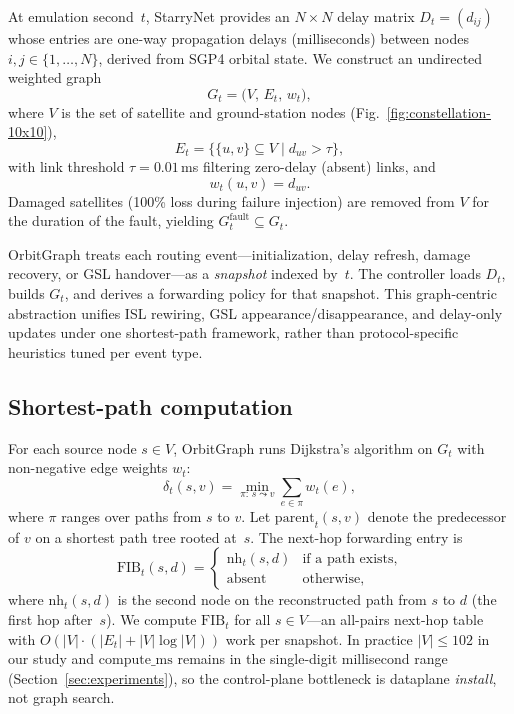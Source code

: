 At emulation second~$t$, StarryNet provides an $N \times N$ delay matrix
$D_t = (d_{ij})$ whose entries are one-way propagation delays (milliseconds)
between nodes $i,j \in \{1,\ldots,N\}$, derived from SGP4 orbital state.
We construct an undirected weighted graph
\begin{equation}
  G_t = \bigl(V,\, E_t,\, w_t\bigr),
  \label{eq:graph}
\end{equation}
where $V$ is the set of satellite and ground-station nodes (Fig.~\ref{fig:constellation-10x10}),
\begin{equation}
  E_t = \bigl\{ \{u,v\} \subseteq V \;\big|\;
         d_{uv} > \tau \bigr\},
  \label{eq:edges}
\end{equation}
with link threshold $\tau = 0.01$\,ms filtering zero-delay (absent) links, and
\begin{equation}
  w_t(u,v) = d_{uv}.
  \label{eq:weight}
\end{equation}
Damaged satellites (100\% loss during failure injection) are removed from $V$
for the duration of the fault, yielding $G_t^{\mathrm{fault}} \subseteq G_t$.

OrbitGraph treats each routing event---initialization, delay refresh, damage
recovery, or GSL handover---as a \emph{snapshot} indexed by~$t$.
The controller loads $D_t$, builds $G_t$, and derives a forwarding policy for
that snapshot.
This graph-centric abstraction unifies ISL rewiring, GSL appearance/disappearance,
and delay-only updates under one shortest-path framework, rather than
protocol-specific heuristics tuned per event type.

\subsection{Shortest-path computation}

For each source node $s \in V$, OrbitGraph runs Dijkstra's algorithm on
$G_t$ with non-negative edge weights $w_t$:
\begin{equation}
  \delta_t(s,v) = \min_{\pi:\, s \leadsto v} \sum_{e \in \pi} w_t(e),
  \label{eq:dist}
\end{equation}
where $\pi$ ranges over paths from $s$ to $v$.
Let $\mathrm{parent}_t(s,v)$ denote the predecessor of $v$ on a shortest
path tree rooted at~$s$.
The next-hop forwarding entry is
\begin{equation}
  \mathrm{FIB}_t(s,d) =
  \begin{cases}
    \mathrm{nh}_t(s,d) & \text{if a path exists}, \\
    \text{absent}      & \text{otherwise},
  \end{cases}
  \label{eq:fib}
\end{equation}
where $\mathrm{nh}_t(s,d)$ is the second node on the reconstructed path
from $s$ to $d$ (the first hop after~$s$).
We compute $\mathrm{FIB}_t$ for all $s \in V$---an all-pairs next-hop table
with $O(|V| \cdot (|E_t| + |V| \log |V|))$ work per snapshot.
In practice $|V| \le 102$ in our study and $\mathrm{compute\_ms}$ remains in
the single-digit millisecond range (Section~\ref{sec:experiments}), so the
control-plane bottleneck is dataplane \emph{install}, not graph search.

